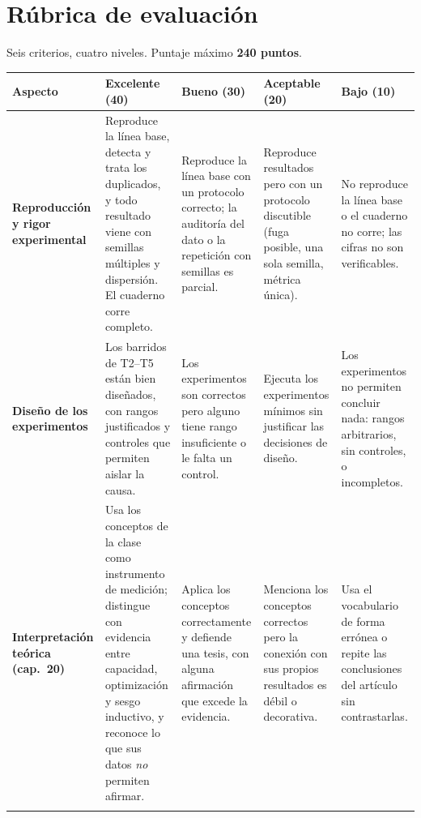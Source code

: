 \documentclass[11pt, a4paper]{article}
\begin{document}
\section{Rúbrica de evaluación}
\label{sec:rubrica}

\noindent
Seis criterios, cuatro niveles. Puntaje m\'aximo \textbf{240 puntos}.

\vspace{0.6em}
\footnotesize
\noindent
\begin{tabularx}{\textwidth}{@{}>{\raggedright\arraybackslash}p{2.35cm} XXXX@{}}
\toprule
\textbf{Aspecto} & \textbf{Excelente (40)} & \textbf{Bueno (30)} & \textbf{Aceptable (20)} & \textbf{Bajo (10)}\\
\midrule

\textbf{Reproducción y rigor experimental}
& Reproduce la l\'inea base, detecta y trata los duplicados, y todo resultado viene con semillas m\'ultiples y dispersi\'on. El cuaderno corre completo.
& Reproduce la l\'inea base con un protocolo correcto; la auditor\'ia del dato o la repetici\'on con semillas es parcial.
& Reproduce resultados pero con un protocolo discutible (fuga posible, una sola semilla, m\'etrica \'unica).
& No reproduce la l\'inea base o el cuaderno no corre; las cifras no son verificables.\\
\addlinespace[3pt]

\textbf{Diseño de los experimentos}
& Los barridos de T2--T5 est\'an bien dise\~nados, con rangos justificados y controles que permiten aislar la causa.
& Los experimentos son correctos pero alguno tiene rango insuficiente o le falta un control.
& Ejecuta los experimentos m\'inimos sin justificar las decisiones de dise\~no.
& Los experimentos no permiten concluir nada: rangos arbitrarios, sin controles, o incompletos.\\
\addlinespace[3pt]

\textbf{Interpretación teórica (cap.~20)}
& Usa los conceptos de la clase como instrumento de medici\'on; distingue con evidencia entre capacidad, optimizaci\'on y sesgo inductivo, y reconoce lo que sus datos \emph{no} permiten afirmar.
& Aplica los conceptos correctamente y defiende una tesis, con alguna afirmaci\'on que excede la evidencia.
& Menciona los conceptos correctos pero la conexi\'on con sus propios resultados es d\'ebil o decorativa.
& Usa el vocabulario de forma err\'onea o repite las conclusiones del art\'iculo sin contrastarlas.\\
\addlinespace[3pt]


\end{tabularx}
\end{document}
